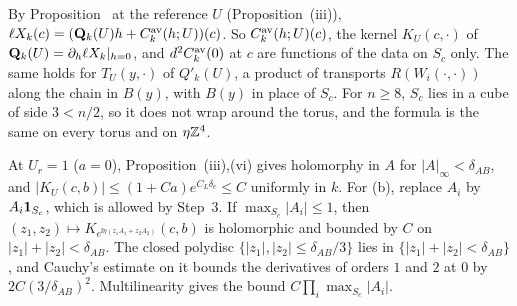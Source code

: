 \begin{detail}
\begin{step}[Consequences]
By Proposition~ at the reference $U$ (Proposition~(iii)), $\ell X_k(c)=(\mathbf Q_k(U)h+C^{\rm av}_k(h;U))(c)$. So $C^{\rm av}_k(h;U)(c)$, the kernel $K_U(c,\cdot)$ of $\mathbf Q_k(U)=\partial_h\ell X_k|_{h=0}$, and $d^2C^{\rm av}_k(0)$ at $c$ are functions of the data on $S_c$ only. The same holds for $T_U(y,\cdot)$ of $Q'_k(U)$, a product of transports $R(W_i(\cdot,\cdot))$ along the chain in $B(y)$, with $B(y)$ in place of $S_c$. For $n\ge8$, $S_c$ lies in a cube of side $3<n/2$, so it does not wrap around the torus, and the formula is the same on every torus and on $\eta\mathbb Z^4$.
\end{step}
\begin{step}
At $U_r=1$ ($a=0$), Proposition~(iii),(vi) gives holomorphy in $A$ for $|A|_\infty<\delta_{AB}$, and $|K_U(c,b)|\le(1+Ca)e^{C_L\delta_c}\le C$ uniformly in $k$. For (b), replace $A_i$ by $A_i\mathbf 1_{S_c}$, which is allowed by Step~3. If $\max_{S_c}|A_i|\le1$, then $(z_1,z_2)\mapsto K_{e^{\ii\eta(z_1A_1+z_2A_2)}}(c,b)$ is holomorphic and bounded by $C$ on $|z_1|+|z_2|<\delta_{AB}$. The closed polydisc $\{|z_1|,|z_2|\le\delta_{AB}/3\}$ lies in $\{|z_1|+|z_2|<\delta_{AB}\}$, and Cauchy's estimate on it bounds the derivatives of orders $1$ and $2$ at $0$ by $2C(3/\delta_{AB})^2$. Multilinearity gives the bound $C\prod_i\max_{S_c}|A_i|$.
\end{step}
\end{detail}

